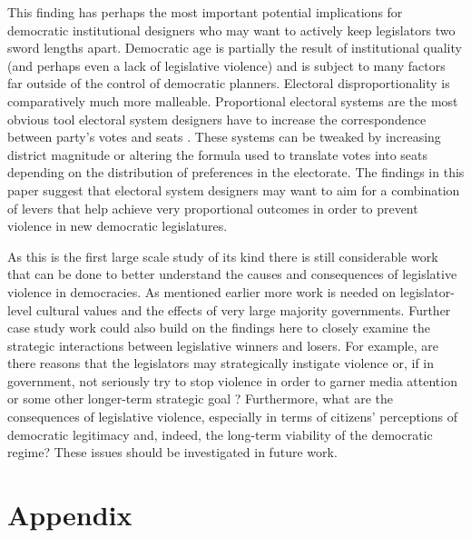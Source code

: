 \documentclass[a4paper]{article}\usepackage{graphicx, color}
\begin{document}
This finding has perhaps the most important potential implications for democratic institutional designers who may want to actively keep legislators two sword lengths apart. Democratic age is partially the result of institutional quality (and perhaps even a lack of legislative violence) and is subject to many factors far outside of the control of democratic planners. Electoral disproportionality is comparatively much more malleable. Proportional electoral systems are the most obvious tool electoral system designers have to increase the correspondence between party's votes and seats \citep{Carey2011}. These systems can be tweaked by increasing district magnitude or altering the formula used to translate votes into seats depending on the distribution of preferences in the electorate. The findings in this paper suggest that electoral system designers may want to aim for a combination of levers that help achieve very proportional outcomes in order to prevent violence in new democratic legislatures. 

As this is the first large scale study of its kind there is still considerable work that can be done to better understand the causes and consequences of legislative violence in democracies. As mentioned earlier more work is needed on legislator-level cultural values and the effects of very large majority governments. Further case study work could also build on the findings here to closely examine the strategic interactions between legislative winners and losers. For example, are there reasons that the legislators may strategically instigate violence or, if in government, not seriously try to stop violence in order to garner media attention or some other longer-term strategic goal \citep[e.g.][]{Beaulieu2008}? Furthermore, what are the consequences of legislative violence, especially in terms of citizens' perceptions of democratic legitimacy and, indeed, the long-term viability of the democratic regime? These issues should be investigated in future work. 





\theendnotes


\clearpage
\section*{Appendix}
\end{document}
